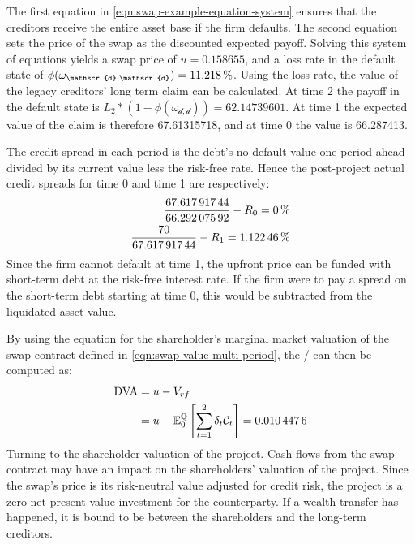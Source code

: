 \documentclass[main.tex]{subfiles}
\begin{document}
        The first equation in \cref{eqn:swap-example-equation-system} ensures that the creditors receive the entire asset base if the firm defaults.
        The second equation sets the price of the swap as the discounted expected payoff.
        Solving this system of equations yields a swap price of $u=\num{0.158655}$,
        and a loss rate in the default state of 
        $\phi(\omega_{\mathscr{d},\mathscr{d}})=\pct{0.112180}$.
        Using the loss rate, the value of the legacy creditors' long term claim can be calculated.
        At time 2 the payoff in the default state is 
        $L_{2}*(1-\phi(\omega_{\mathscr{d},\mathscr{d}})) = \num{62.14739601}$.
        At time 1 the expected value of the claim is therefore \num{67.61315718},
        and at time 0 the value is \num{66.287413}.

        The credit spread in each period is the debt's no-default value one period ahead
        divided by its current value less the risk-free rate.
        Hence the post-project actual credit spreads for time 0 and time 1 are respectively:
        \begin{align*}
            \frac{
                \num{67.61791744}
            }{
                \num{66.29207592}
            }
            -
            R_{0}
            =
            \pct{0}
            \\
            \frac{
                \num{70}
            }{
                \num{67.61791744}
            } 
            -
            R_{1}
            =
            \pct{0.0112246}
        \end{align*}
        Since the firm cannot default at time 1,
        the upfront price can be funded with short-term debt at the risk-free interest rate.
        If the firm were to pay a spread on the short-term debt starting at time 0,
        this would be subtracted from the liquidated asset value. 

        By using the equation for the shareholder's marginal market valuation of the swap contract
        defined in \cref{eqn:swap-value-multi-period},
        the \DVA/ can then be computed as:
        \begin{align*}
            \DVA/ &= u - V_{rf}
            \nonumber
            \\
            &= u - \mathbb{E}_{0}^{\rnmeasure}\left[\sum_{t=1}^{2}\delta_t \mathcal{C}_t\right]
            = \num{0.0104476}
        \end{align*}
        Turning to the shareholder valuation of the project.
        Cash flows from the swap contract may have an impact on the shareholders' valuation of the project.
        Since the swap's price is its risk-neutral value adjusted for credit risk,
        the project is a zero net present value investment for the counterparty.
        If a wealth transfer has happened, it is bound to be between the shareholders and the long-term creditors.
\end{document}
